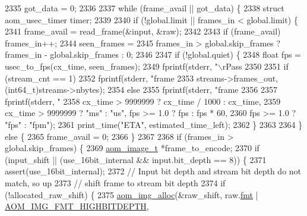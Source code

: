 \begin{DoxyCodeInclude}
{{{{{{{{{{{{{{{{{{{{{{{{{{{{{{{{{{{{{{{{{{{{{{{{{{{{{{2335     got\_data = 0;
2336 
2337     \textcolor{keywordflow}{while} (frame\_avail || got\_data) \{
2338       \textcolor{keyword}{struct }aom\_usec\_timer timer;
2339 
2340       \textcolor{keywordflow}{if} (!global.limit || frames\_in < global.limit) \{
2341         frame\_avail = read\_frame(&input, &raw);
2342 
2343         \textcolor{keywordflow}{if} (frame\_avail) frames\_in++;
2344         seen\_frames =
2345             frames\_in > global.skip\_frames ? frames\_in - global.skip\_frames : 0;
2346 
2347         \textcolor{keywordflow}{if} (!global.quiet) \{
2348           \textcolor{keywordtype}{float} fps = usec\_to\_fps(cx\_time, seen\_frames);
2349           fprintf(stderr, \textcolor{stringliteral}{"\(\backslash\)rPass %
2350 
2351           \textcolor{keywordflow}{if} (stream\_cnt == 1)
2352             fprintf(stderr, \textcolor{stringliteral}{"frame %
2353                     streams->frames\_out, (int64\_t)streams->nbytes);
2354           \textcolor{keywordflow}{else}
2355             fprintf(stderr, \textcolor{stringliteral}{"frame %
2356 
2357           fprintf(stderr, \textcolor{stringliteral}{"%
2358                   cx\_time > 9999999 ? cx\_time / 1000 : cx\_time,
2359                   cx\_time > 9999999 ? \textcolor{stringliteral}{"ms"} : \textcolor{stringliteral}{"us"}, fps >= 1.0 ? fps : fps * 60,
2360                   fps >= 1.0 ? \textcolor{stringliteral}{"fps"} : \textcolor{stringliteral}{"fpm"});
2361           print\_time(\textcolor{stringliteral}{"ETA"}, estimated\_time\_left);
2362         \}
2363 
2364       \} \textcolor{keywordflow}{else} \{
2365         frame\_avail = 0;
2366       \}
2367 
2368       \textcolor{keywordflow}{if} (frames\_in > global.skip\_frames) \{
2369         \hyperlink{structaom__image}{aom\_image\_t} *frame\_to\_encode;
2370         \textcolor{keywordflow}{if} (input\_shift || (use\_16bit\_internal && input.bit\_depth == 8)) \{
2371           assert(use\_16bit\_internal);
2372           \textcolor{comment}{// Input bit depth and stream bit depth do not match, so up}
2373           \textcolor{comment}{// shift frame to stream bit depth}
2374           \textcolor{keywordflow}{if} (!allocated\_raw\_shift) \{
2375             \hyperlink{aom__image_8h_a570db29fbd122951235a08fe9375f6bb}{aom\_img\_alloc}(&raw\_shift, raw.\hyperlink{structaom__image_a6c64b1ab918d80d52eb8f5d6d957e825}{fmt} | 
      \hyperlink{aom__image_8h_a607b37d91f75442f54223ecd85f1b6cb}{AOM\_IMG\_FMT\_HIGHBITDEPTH},
}}}}}}}}}}}}}}}}}}}}}}}}}}}}}}}}}}}}}}}}}}}}}}}}}}}}}}}}}}
\end{DoxyCodeInclude}
